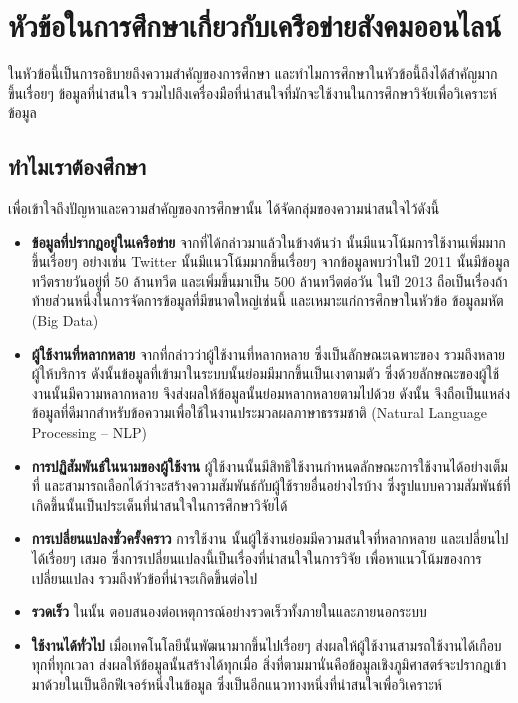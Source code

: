 \section{หัวข้อในการศึกษาเกี่ยวกับเครือข่ายสังคมออนไลน์}
ในหัวข้อนี้เป็นการอธิบายถึงความสำคัญของการศึกษา{\OSN} 
และทำไมการศึกษาในหัวข้อนี้ถึงได้สำคัญมากขึ้นเรื่อยๆ ข้อมูลที่น่าสนใจ 
รวมไปถึงเครื่องมือที่น่าสนใจที่มักจะใช้งานในการศึกษาวิจัยเพื่อวิเคราะห์ข้อมูล{\OSN}

\subsection{ทำไมเราต้องศึกษา{\OSN}}

เพื่อเข้าใจถึงปัญหาและความสำคัญของการศึกษานั้น ได้จัดกลุ่มของความน่าสนใจไว้ดังนี้
\begin{itemize}
    \item \textbf{ข้อมูลที่ปรากฎอยู่ในเครือข่าย} จากที่ได้กล่าวมาแล้วในข้างต้นว่า {\OSN} 
    นั้นมีแนวโน้มการใช้งานเพิ่มมากขึ้นเรื่อยๆ อย่างเช่น Twitter นั้นมีแนวโน้มมากขึ้นเรื่อยๆ 
    จากข้อมูลพบว่าในปี 2011 นั้นมีข้อมูลทวีตรายวันอยู่ที่ 50 ล้านทวีต และเพิ่มขึ้นมาเป็น 
    500 ล้านทวีตต่อวัน ในปี 2013 \cite{web:twitter-usange-statistics}
    ถือเป็นเรื่องถ้าท้ายส่วนหนึ่งในการจัดการข้อมูลที่มีขนาดใหญ่เช่นนี้
    และเหมาะแก่การศึกษาในหัวข้อ ข้อมูลมหัต (Big Data)

    \item \textbf{ผู้ใช้งานที่หลากหลาย} จากที่กล่าวว่าผู้ใช้งานที่หลากหลาย 
    ซึ่งเป็นลักษณะเฉพาะของ{\OSN} รวมถึงหลายผู้ให้บริการ ดังนั้นข้อมูลที่เข้ามาในระบบนั้นย่อมมีมากขึ้นเป็นเงาตามตัว
    ซึ่งด้วยลักษณะของผู้ใช้งานนั้นมีความหลากหลาย จึงส่งผลให้ข้อมูลนั้นย่อมหลากหลายตามไปด้วย
    ดังนั้น{\OSN} จึงถือเป็นแหล่งข้อมูลที่ดีมากสำหรับข้อความเพื่อใช้ในงานประมวลผลภาษาธรรมชาติ 
    (Natural Language Processing -- NLP)

    \item \textbf{การปฏิสัมพันธ์ในนามของผู้ใช้งาน} ผู้ใช้งานนั้นมีสิทธิใช้งานกำหนดลักษณะการใช้งาน{\OSN}ได้อย่างเต็มที่
    และสามารถเลือกได้ว่าจะสร้างความสัมพันธ์กับผู้ใช้รายอื่นอย่างไรบ้าง 
    ซึ่งรูปแบบความสัมพันธ์ที่เกิดขึ้นนั้นเป็นประเด็นที่น่าสนใจในการศึกษาวิจัยได้

    \item \textbf{การเปลี่ยนแปลงชั่วครั้งคราว} การใช้งาน{\OSN} นั้นผู้ใช้งานย่อมมีความสนใจที่หลากหลาย
    และเปลี่ยนไปได้เรื่อยๆ เสมอ ซึ่งการเปลี่ยนแปลงนี้เป็นเรื่องที่น่าสนใจในการวิจัย 
    เพื่อหาแนวโน้มของการเปลี่ยนแปลง รวมถึงหัวข้อที่น่าจะเกิดขึ้นต่อไป

    \item \textbf{รวดเร็ว} ใน{\OSN}นั้น ตอบสนองต่อเหตุการณ์อย่างรวดเร็วทั้งภายในและภายนอกระบบ

    \item \textbf{ใช้งานได้ทั่วไป} เมื่อเทคโนโลยีนั้นพัฒนามากขึ้นไปเรื่อยๆ 
    ส่งผลให้ผู้ใช้งานสามรถใช้งานได้เกือบทุกที่ทุกเวลา ส่งผลให้ข้อมูลนั้นสร้างได้ทุกเมื่อ 
    สิ่งที่ตามมานั่นคือข้อมูลเชิงภูมิศาสตร์จะปรากฎเข้ามาด้วยในเป็นอีกฟีเจอร์หนึ่งในข้อมูล{\OSN} 
    ซึ่งเป็นอีกแนวทางหนึ่งที่น่าสนใจเพื่อวิเคราะห์

\end{itemize}